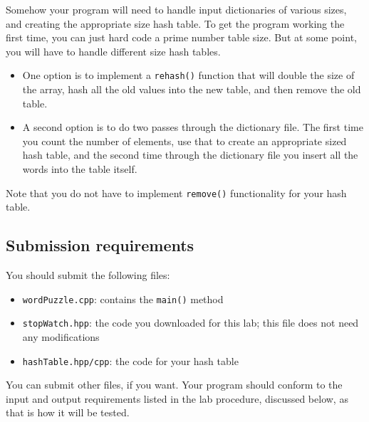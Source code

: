 \documentclass[11pt]{article}
\begin{document}
Somehow your program will need to handle input dictionaries of various sizes, and creating the appropriate size hash table. To get the program working the first time, you can just hard code a prime number table size. But at some point, you will have to handle different size hash tables.
\begin{itemize}
\item    One option is to implement a \lstinline|rehash()| function that will double the size of the array, hash all the old values into the new table, and then remove the old table.
\item    A second option is to do two passes through the dictionary file. The first time you count the number of elements, use that to create an appropriate sized hash table, and the second time through the dictionary file you insert all the words into the table itself.
\end{itemize}

Note that you do not have to implement \lstinline|remove()| functionality for your hash table.

\subsection*{Submission requirements}

You should submit the following files:
\begin{itemize}
    \item \texttt{wordPuzzle.cpp}: contains the \lstinline|main()| method
    \item \texttt{stopWatch.hpp}: the code you downloaded for this lab; this file does not need any modifications
    \item \texttt{hashTable.hpp/cpp}: the code for your hash table
\end{itemize}

You can submit other files, if you want. Your program should conform to the input and output requirements listed in the lab procedure, discussed below, as that is how it will be tested. 
\end{document}
